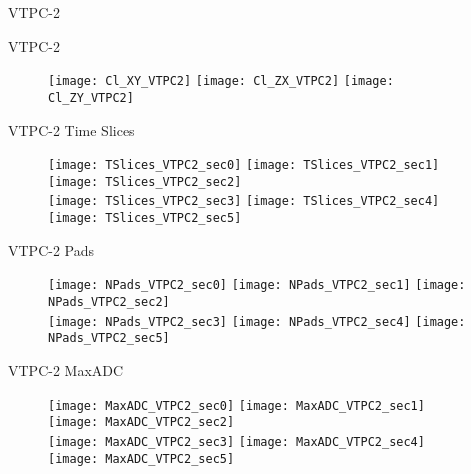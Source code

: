 \documentclass[11pt]{beamer}
\begin{document}
\begin{frame}
\centering
\Huge
VTPC-2
\end{frame}

\begin{frame}{VTPC-2}
\begin{figure}
\centering
\texttt{[image: Cl\_XY\_VTPC2]}
\texttt{[image: Cl\_ZX\_VTPC2]}
\texttt{[image: Cl\_ZY\_VTPC2]}
\end{figure}
\end{frame}

\begin{frame}{VTPC-2 Time Slices}
\begin{figure}
\centering
\texttt{[image: TSlices\_VTPC2\_sec0]}
\texttt{[image: TSlices\_VTPC2\_sec1]}
\texttt{[image: TSlices\_VTPC2\_sec2]}\\
\texttt{[image: TSlices\_VTPC2\_sec3]}
\texttt{[image: TSlices\_VTPC2\_sec4]}
\texttt{[image: TSlices\_VTPC2\_sec5]}
\end{figure}
\end{frame}

\begin{frame}{VTPC-2 Pads}
\begin{figure}
\centering
\texttt{[image: NPads\_VTPC2\_sec0]}
\texttt{[image: NPads\_VTPC2\_sec1]}
\texttt{[image: NPads\_VTPC2\_sec2]}\\
\texttt{[image: NPads\_VTPC2\_sec3]}
\texttt{[image: NPads\_VTPC2\_sec4]}
\texttt{[image: NPads\_VTPC2\_sec5]}
\end{figure}
\end{frame}

\begin{frame}{VTPC-2 MaxADC}
\begin{figure}
\centering
\texttt{[image: MaxADC\_VTPC2\_sec0]}
\texttt{[image: MaxADC\_VTPC2\_sec1]}
\texttt{[image: MaxADC\_VTPC2\_sec2]}\\
\texttt{[image: MaxADC\_VTPC2\_sec3]}
\texttt{[image: MaxADC\_VTPC2\_sec4]}
\texttt{[image: MaxADC\_VTPC2\_sec5]}
\end{figure}
\end{frame}
\end{document}
